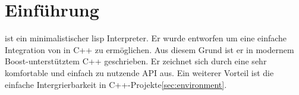 \section{Einführung}
\label{sec:cxx_interface}

\projectname{} ist ein minimalistischer lisp Interpreter. Er wurde entworfen um eine einfache
Integration von in C++ zu ermöglichen. Aus diesem Grund ist er in modernem Boost-unterstütztem
C++ geschrieben. Er zeichnet sich durch eine sehr komfortable und einfach zu nutzende API aus.
Ein weiterer Vorteil ist die einfache Intergrierbarkeit in C++-Projekte\ref{sec:environment}.
